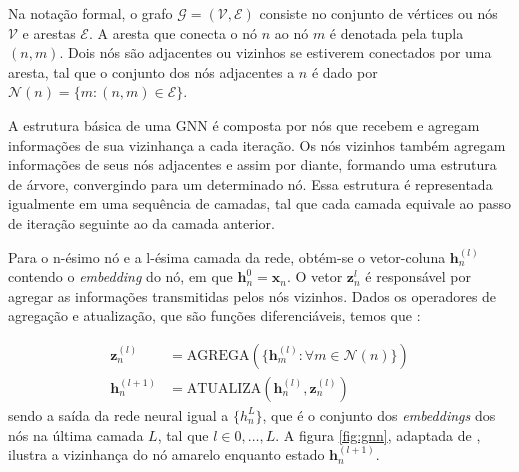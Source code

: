 Na notação formal, o grafo $\mathcal{G} = (\mathcal{V}, \mathcal{E})$ consiste no conjunto de
vértices ou nós $\mathcal{V}$ e arestas $\mathcal{E}$. A aresta que conecta
o nó $n$ ao nó $m$ é denotada pela tupla $(n, m)$. Dois nós são adjacentes ou vizinhos
se estiverem conectados por uma aresta, tal que o conjunto dos nós adjacentes a $n$
é dado por $\mathcal{N}(n) = \{m : (n, m) \in \mathcal{E}\}$.

A estrutura básica de uma GNN é composta por nós que recebem e agregam
informações de sua vizinhança a cada iteração. Os nós vizinhos também agregam
informações de seus nós adjacentes e assim por diante, formando uma estrutura de
árvore, convergindo para um determinado nó. Essa estrutura é representada
igualmente em uma sequência de camadas, tal que cada camada equivale ao passo de
iteração seguinte ao da camada anterior.

Para o n-ésimo nó e a l-ésima camada da rede, obtém-se o vetor-coluna
$\mathbf{h}^{(l)}_n$ contendo o \textit{embedding} do nó, em que
$\mathbf{h}^{0}_n = \mathbf{x}_n$. O vetor $\mathbf{z}^{l}_n$ é responsável
por agregar as informações transmitidas pelos nós vizinhos. Dados os operadores
de agregação e atualização, que são funções diferenciáveis, temos que \cite{Bishop:DeepLearning24}:

\begin{align}
    \mathbf{z}^{(l)}_n &= \text{AGREGA}( \{ \mathbf{h}^{(l)}_m : \forall m \in \mathcal{N}(n)\} ) \label{eq:agrega} \\
    \mathbf{h}^{(l+1)}_n &= \text{ATUALIZA}(\mathbf{h}^{(l)}_n, \mathbf{z}^{(l)}_n) \label{eq:atualiza}
\end{align}
sendo a saída da rede neural igual a $\{h^{L}_n\}$, que é o conjunto dos
\textit{embeddings} dos nós na última camada $L$, tal que $l \in {0, \ldots,
L}$. A figura \ref{fig:gnn}, adaptada de \citet{graph_rep_learning}, ilustra
a vizinhança do nó amarelo enquanto estado $\mathbf{h}^{(l+1)}_n$.

